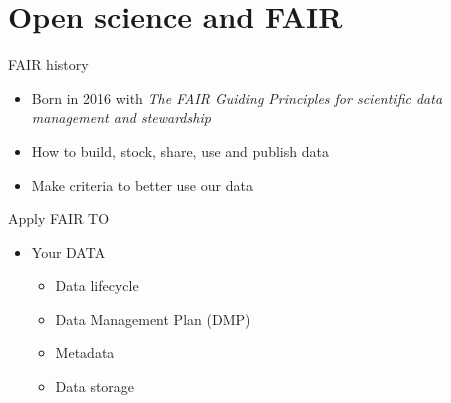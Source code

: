 \section{Open science and FAIR}

\begin{frame}
\begin{block}{FAIR history}
\begin{itemize}
\item Born in 2016 with \textit{The FAIR Guiding Principles for scientific data management and stewardship}
\item How to build, stock, share, use and publish data
\item Make criteria to better use our data
\end{itemize}
\end{block}
\end{frame}

\begin{frame}
\end{frame}

\begin{frame}
\begin{block}{Apply FAIR TO}
\begin{itemize}
\item Your DATA
	\begin{itemize}
	\item Data lifecycle
	\item Data Management Plan (DMP)
	\item Metadata
	\item Data storage
	\end{itemize}
\end{itemize}
\end{block}
\end{frame}

